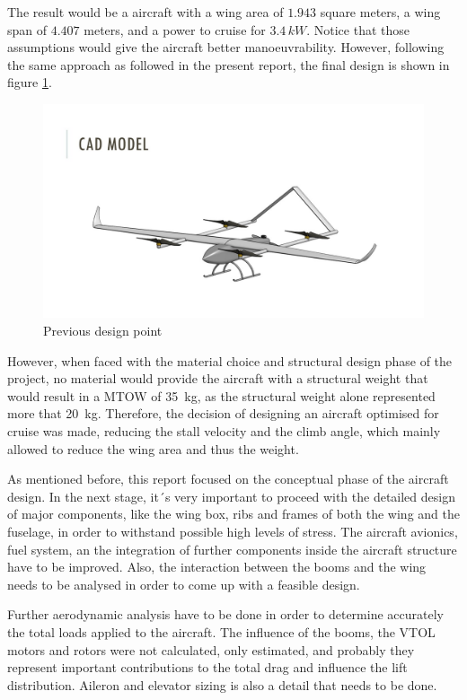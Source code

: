 \documentclass[english,fira]{ist-report}
\begin{document}
The result would be a aircraft with a wing area of $1.943$ square meters, a wing span of $4.407$ meters, and a power to cruise for $3.4\,kW$. Notice that those assumptions would give the aircraft better manoeuvrability. However, following the same approach as followed in the present report, the final design is shown in figure \ref{fig:oldpoint}.

\begin{figure}[!ht]
	\centering
	\includegraphics[width = 1\linewidth]{graphics/old_cad.jpg}
	\caption{Previous design point}
	\label{fig:oldpoint}
\end{figure}

However, when faced with the material choice and structural design phase of the project, no material would provide the aircraft with a structural weight that would result in a MTOW of \SI{35}{\kilogram}, as the structural weight alone represented more that \SI{20}{\kilogram}. Therefore, the decision of designing an aircraft optimised for cruise was made, reducing the stall velocity and the climb angle, which mainly allowed to reduce the wing area and thus the weight. 

As mentioned before, this report focused on the conceptual phase of the aircraft design. In the next stage, it´s very important to proceed with the detailed design of major components, like the wing box, ribs and frames of both the wing and the fuselage, in order to withstand possible high levels of stress. The aircraft avionics, fuel system, an the integration of further components inside the aircraft structure have to be improved. Also, the interaction between the booms and the wing needs to be analysed in order to come up with a feasible design. 

 Further aerodynamic analysis have to be done in order to determine accurately the total loads applied to the aircraft. The influence of the booms, the VTOL motors and rotors were not calculated, only estimated, and probably they represent important contributions to the total drag and influence the lift distribution. Aileron and elevator sizing is also a detail that needs to be done. 
\end{document}
